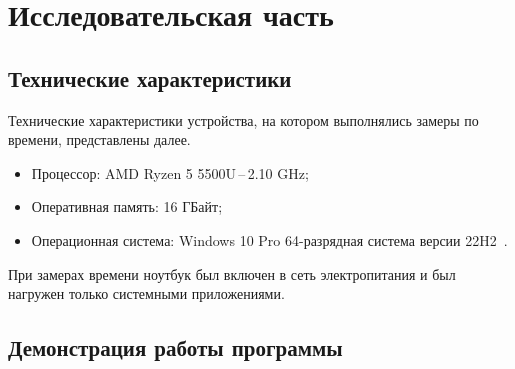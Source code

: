 \chapter{Исследовательская часть}

\section{Технические характеристики}

Технические характеристики устройства, на котором выполнялись замеры по времени, представлены далее.

\begin{itemize}
	\item Процессор: AMD Ryzen 5 5500U\,--\,2.10 GHz;
	\item Оперативная память: 16 ГБайт;
	\item Операционная система: Windows 10 Pro 64-разрядная система версии 22H2~\cite{windows}.
\end{itemize}

При замерах времени ноутбук был включен в сеть электропитания и был нагружен только системными приложениями.

\section{Демонстрация работы программы}

